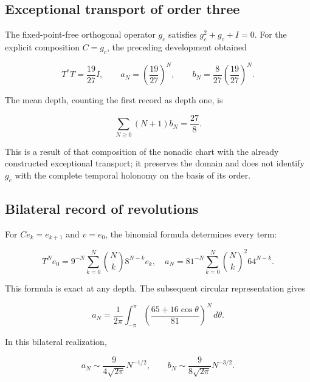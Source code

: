 \subsection{Exceptional transport of order three}

The fixed-point-free orthogonal operator \(g_c\) satisfies \(g_c^2+g_c+I=0\). For the explicit composition \(C=g_c\), the preceding development obtained

\begin{equation}
T^*T=\frac{19}{27}I,
\qquad a_N=\left(\frac{19}{27}\right)^N,
\qquad b_N=\frac8{27}\left(\frac{19}{27}\right)^N.
\label{x_reciprocidad:nuc03:eq:16}
\end{equation}

The mean depth, counting the first record as depth one, is

\begin{equation}
\sum_{N\geq0}(N+1)b_N=\frac{27}{8}.
\label{x_reciprocidad:nuc03:eq:17}
\end{equation}

This is a result of that composition of the nonadic chart with the already constructed exceptional transport; it preserves the domain and does not identify \(g_c\) with the complete temporal holonomy on the basis of its order.

\subsection{Bilateral record of revolutions}

For \(C e_k=e_{k+1}\) and \(v=e_0\), the binomial formula determines every term:

\begin{equation}
T^Ne_0=9^{-N}\sum_{k=0}^{N}\binom{N}{k}8^{N-k}e_k,
\quad
a_N=81^{-N}\sum_{k=0}^{N}\binom{N}{k}^{\!2}64^{N-k}.
\label{x_reciprocidad:nuc03:eq:18}
\end{equation}

This formula is exact at any depth. The subsequent circular representation gives

\begin{equation}
a_N=\frac1{2\pi}\int_{-\pi}^{\pi}
\left(\frac{65+16\cos\theta}{81}\right)^N\,d\theta.
\label{x_reciprocidad:nuc03:eq:19}
\end{equation}

\begin{theorem}
In this bilateral realization,

\begin{equation}
\boxed{a_N\sim\frac9{4\sqrt{2\pi}}N^{-1/2},\qquad
b_N\sim\frac9{8\sqrt{2\pi}}N^{-3/2}.}
\label{x_reciprocidad:nuc03:eq:20}
\end{equation}
\end{theorem}

